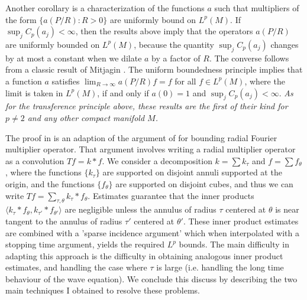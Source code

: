 \documentclass[11pt]{article}
\DeclareMathOperator{\RR}{\mathbb{R}}
\begin{document}
Another corollary is a characterization of the functions $a$ such that multipliers of the form $\{ a(P/R) : R > 0 \}$ are uniformly bound on $L^p(M)$. If $\sup_j C_p(a_j) < \infty$, then the results above imply that the operators $a(P/R)$ are uniformly bounded on $L^p(M)$, because the quantity $\sup_j C_p(a_j)$ changes by at most a constant when we dilate $a$ by a factor of $R$. The converse follows from a classic result of Mitjagin \cite{Mitjagin}.
The uniform boundedness principle implies that a function $a$ satisfies $\lim_{R \to \infty} a(P/R) f = f$ for all $f \in L^p(M)$, where the limit is taken in $L^p(M)$, if and only if $a(0) = 1$ and $\sup_j C_p(a_j) < \infty$. \emph{As for the transference principle above, these results are the first of their kind for $p \neq 2$ and any other compact manifold $M$.}


The proof in \cite{DensonCharacterization} is an adaption of the argument of \cite{HeoNazarovSeeger} for bounding radial Fourier multiplier operator. That argument involves writing a radial multiplier operator as a convolution $Tf = k * f$. We consider a decomposition $k = \sum k_\tau$ and $f = \sum f_\theta$, where the functions $\{ k_\tau \}$ are supported on disjoint annuli supported at the origin, and the functions $\{ f_\theta \}$ are supported on disjoint cubes, and thus we can write $T f = \sum_{\tau,\theta} k_\tau * f_\theta$. Estimates guarantee that the inner products $\langle k_\tau * f_\theta, k_{\tau'} * f_{\theta'} \rangle$ are negligible unless the annulus of radius $\tau$ centered at $\theta$ is near tangent to the annulus of radius $\tau'$ centered at $\theta'$. These inner product estimates are combined with a 'sparse incidence argument' which when interpolated with a stopping time argument, yields the required $L^p$ bounds. The main difficulty in adapting this approach is the difficulty in obtaining analogous inner product estimates, and handling the case where $\tau$ is large (i.e. handling the long time behaviour of the wave equation). We conclude this discuss by describing the two main techniques I obtained to resolve these problems.
\end{document}

